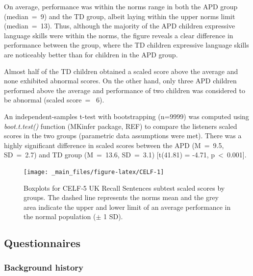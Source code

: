 \documentclass[a4paper, twoside]{templates/ociamthesis}
\begin{document}
On average, performance was within the norms range in both the APD group (median~=~9) and the TD group, albeit laying within the upper norms limit (median~=~13). Thus, although the majority of the APD children expressive language skills were within the norms, the figure reveals a clear difference in performance between the group, where the TD children expressive language skills are noticeably better than for children in the APD group.

Almost half of the TD children obtained a scaled score above the average and none exhibited abnormal scores. On the other hand, only three APD children performed above the average and performance of two children was considered to be abnormal (scaled score~= ~6).

An independent-samples t-test with bootstrapping (n=9999) was computed using \emph{boot.t.test()} function (MKinfer package, REF) to compare the listeners scaled scores in the two groups (parametric data assumptions were met). There was a highly significant difference in scaled scores between the APD (M~=~9.5, SD~=~2.7) and TD group (M~=~13.6, SD~=~3.1) {[}t(41.81) = -4.71, p~\textless~0.001{]}.

\begin{figure}

{\centering \texttt{[image: \_main\_files/figure-latex/CELF-1]} 

}

\caption{Boxplots for CELF-5 UK Recall Sentences subtest scaled scores by groups. The dashed line represents the norms mean and the grey area indicate the upper and lower limit of an average performance in the normal population ($\pm$ 1 SD).}\label{fig:CELF}
\end{figure}

\hypertarget{questionnaires-1}{%
\subsection{Questionnaires}\label{questionnaires-1}}

\hypertarget{background-history}{%
\subsubsection{Background history}\label{background-history}}
\end{document}
